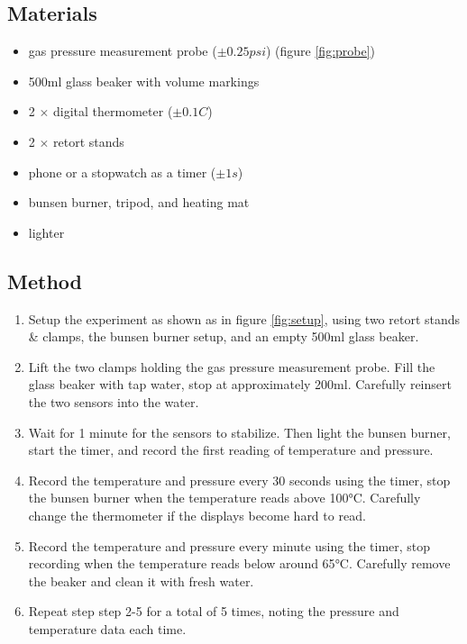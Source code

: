 \documentclass[a4paper,12pt]{article}
\begin{document}
\subsection{Materials}

\begin{itemize}
    \item gas pressure measurement probe ($\pm 0.25\si{psi}$) (figure \ref{fig:probe})
    \item 500ml glass beaker with volume markings
    \item 2 $\times$ digital thermometer ($\pm 0.1\si{C}$)
    \item 2 $\times$ retort stands
    \item phone or a stopwatch as a timer ($\pm 1\si{s}$)
    \item bunsen burner, tripod, and heating mat
    \item lighter
\end{itemize}

\subsection{Method}


\begin{enumerate}
    \item Setup the experiment as shown as in figure \ref{fig:setup}, using two retort stands \& clamps, the bunsen burner setup, and an empty 500ml glass beaker.
    \item Lift the two clamps holding the gas pressure measurement probe. Fill the glass beaker with tap water, stop at approximately 200ml. Carefully reinsert the two sensors into the water.
    \item Wait for 1 minute for the sensors to stabilize. Then light the bunsen burner, start the timer, and record the first reading of temperature and pressure.
    \item Record the temperature and pressure every 30 seconds using the timer, stop the bunsen burner when the temperature reads above 100$\si{\celsius}$. Carefully change the thermometer if the displays become hard to read.
    \item Record the temperature and pressure every minute using the timer, stop recording when the temperature reads below around 65$\si{\celsius}$. Carefully remove the beaker and clean it with fresh water.
    \item Repeat step step 2-5 for a total of 5 times, noting the pressure and temperature data each time.
\end{enumerate}
\end{document}
